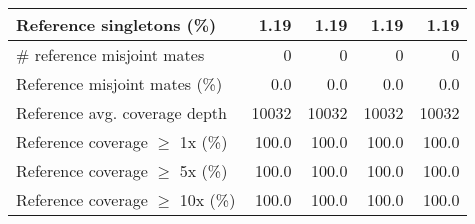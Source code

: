 \documentclass[12pt,a4paper]{article}
\begin{document}
\begin{table}[ht]
\begin{center}
\begin{tabular}{|l*{4}{|r}|}
Reference singletons (\%) & 1.19 & 1.19 & 1.19 & 1.19 \\ \hline
\# reference misjoint mates & 0 & 0 & 0 & 0 \\ \hline
Reference misjoint mates (\%) & 0.0 & 0.0 & 0.0 & 0.0 \\ \hline
Reference avg. coverage depth & 10032 & 10032 & 10032 & 10032 \\ \hline
Reference coverage $\geq$ 1x (\%) & 100.0 & 100.0 & 100.0 & 100.0 \\ \hline
Reference coverage $\geq$ 5x (\%) & 100.0 & 100.0 & 100.0 & 100.0 \\ \hline
Reference coverage $\geq$ 10x (\%) & 100.0 & 100.0 & 100.0 & 100.0 \\ \hline
\end{tabular}
\end{center}
\end{table}
\end{document}
